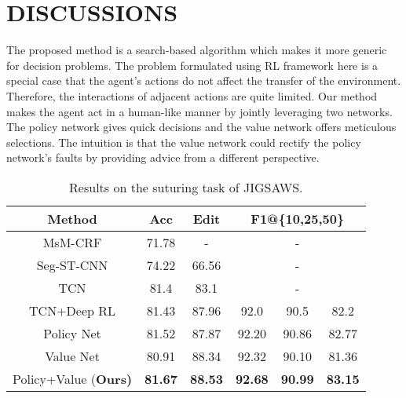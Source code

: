 \documentclass[letterpaper, 10 pt, conference]{ieeeconf}
\begin{document}
\section{DISCUSSIONS}
\label{DISCUSSIONS}
The proposed method is a search-based algorithm which makes it more generic for decision problems. The problem formulated using RL framework here is a special case that the agent's actions do not affect the transfer of the environment. Therefore, the interactions of adjacent actions are quite limited. Our method makes the agent act in a human-like manner by jointly leveraging two networks. The policy network gives quick decisions and the value network offers meticulous selections. The intuition is that the value network could rectify the policy network's faults by providing advice from a different perspective. 

\begin{table}[t]
\caption{Results on the suturing task of JIGSAWS.}
	\label{tab:outcome}
	\centering
	\begin{tabular}{c|ccccc}
		\hline
		Method                              & Acc            & Edit           & \multicolumn{3}{c}{F1@\{10,25,50\}}              \\ \hline
		MsM-CRF \cite{tao2013surgical}     & 71.78          & -              & \multicolumn{3}{c}{-}                            \\
		Seg-ST-CNN \cite{lea2016segmental} & 74.22          & 66.56          & \multicolumn{3}{c}{-}                            \\
		TCN \cite{lea2016temporal}         & 81.4           & 83.1           & \multicolumn{3}{c}{-}                            \\
		TCN+Deep RL \cite{liu2018deep}     & 81.43          & 87.96          & 92.0           & 90.5           & 82.2           \\ \hline
		Policy Net                          & 81.52          & 87.87          & 92.20          & 90.86          & 82.77          \\
		Value Net                           & 80.91          & 88.34          & 92.32          & 90.10          & 81.36          \\
		Policy+Value (\bf{Ours})                      & \textbf{81.67} & \textbf{88.53} & \textbf{92.68} & \textbf{90.99} & \textbf{83.15} \\ \hline
	\end{tabular}
	\vspace{-3mm}
\end{table}
\end{document}
